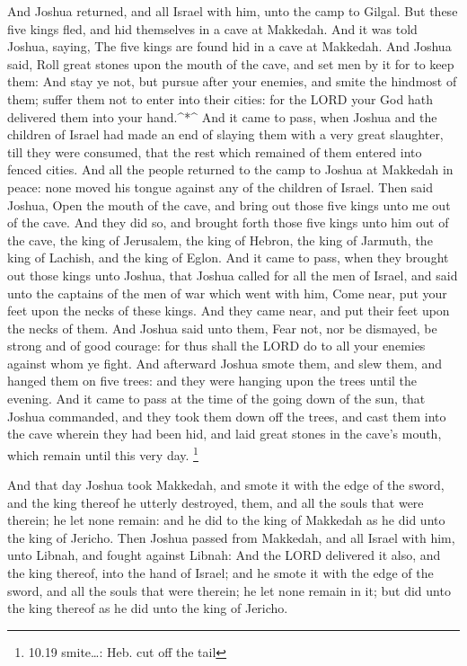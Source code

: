  And Joshua returned, and all Israel with him, unto the
camp to Gilgal.  But these five kings fled, and hid
themselves in a cave at Makkedah.  And it was told Joshua,
saying, The five kings are found hid in a cave at Makkedah.
 And Joshua said, Roll great stones upon the mouth of the
cave, and set men by it for to keep them:  And stay ye not,
but pursue after your enemies, and smite the hindmost of them; suffer
them not to enter into their cities: for the LORD your God hath
delivered them into your hand.\^{}*\^{}  And it came to
pass, when Joshua and the children of Israel had made an end of slaying
them with a very great slaughter, till they were consumed, that the rest
which remained of them entered into fenced cities.  And all
the people returned to the camp to Joshua at Makkedah in peace: none
moved his tongue against any of the children of Israel. 
Then said Joshua, Open the mouth of the cave, and bring out those five
kings unto me out of the cave.  And they did so, and
brought forth those five kings unto him out of the cave, the king of
Jerusalem, the king of Hebron, the king of Jarmuth, the king of Lachish,
and the king of Eglon.  And it came to pass, when they
brought out those kings unto Joshua, that Joshua called for all the men
of Israel, and said unto the captains of the men of war which went with
him, Come near, put your feet upon the necks of these kings. And they
came near, and put their feet upon the necks of them.  And
Joshua said unto them, Fear not, nor be dismayed, be strong and of good
courage: for thus shall the LORD do to all your enemies against whom ye
fight.  And afterward Joshua smote them, and slew them, and
hanged them on five trees: and they were hanging upon the trees until
the evening.  And it came to pass at the time of the going
down of the sun, that Joshua commanded, and they took them down off the
trees, and cast them into the cave wherein they had been hid, and laid
great stones in the cave's mouth, which remain until this very day.
\footnote{10.19 smite\ldots: Heb. cut off the tail}

 And that day Joshua took Makkedah, and smote it with the
edge of the sword, and the king thereof he utterly destroyed, them, and
all the souls that were therein; he let none remain: and he did to the
king of Makkedah as he did unto the king of Jericho.  Then
Joshua passed from Makkedah, and all Israel with him, unto Libnah, and
fought against Libnah:  And the LORD delivered it also, and
the king thereof, into the hand of Israel; and he smote it with the edge
of the sword, and all the souls that were therein; he let none remain in
it; but did unto the king thereof as he did unto the king of Jericho.

